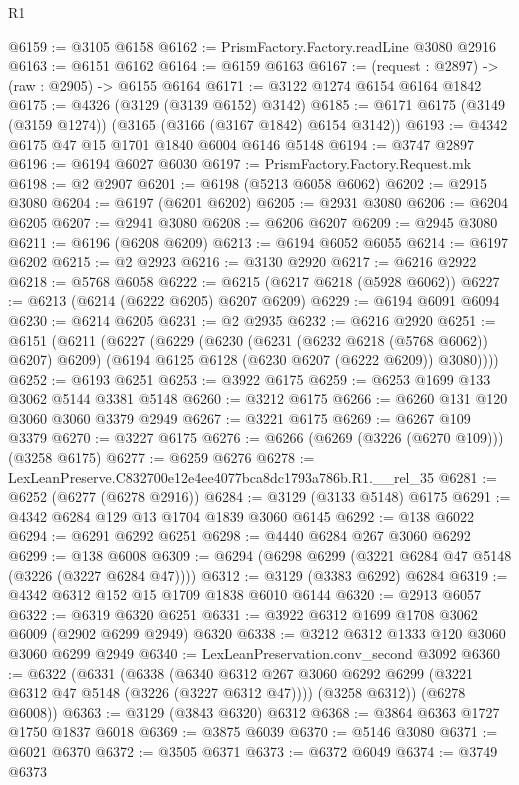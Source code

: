 \begin{lexlean}{R1}
\begin{coremodule}
@6159 := @3105 @6158
@6162 := PrismFactory.Factory.readLine @3080 @2916
@6163 := @6151 @6162
@6164 := @6159 @6163
@6167 := (request : @2897) -> (raw : @2905) -> @6155 @6164
@6171 := @3122 @1274 @6154 @6164 @1842
@6175 := @4326 (@3129 (@3139 @6152) @3142)
@6185 := @6171 @6175 (@3149 (@3159 @1274)) (@3165 (@3166 (@3167 @1842) @6154 @3142))
@6193 := @4342 @6175 @47 @15 @1701 @1840 @6004 @6146 @5148
@6194 := @3747 @2897
@6196 := @6194 @6027 @6030
@6197 := PrismFactory.Factory.Request.mk
@6198 := @2 @2907
@6201 := @6198 (@5213 @6058 @6062)
@6202 := @2915 @3080
@6204 := @6197 (@6201 @6202)
@6205 := @2931 @3080
@6206 := @6204 @6205
@6207 := @2941 @3080
@6208 := @6206 @6207
@6209 := @2945 @3080
@6211 := @6196 (@6208 @6209)
@6213 := @6194 @6052 @6055
@6214 := @6197 @6202
@6215 := @2 @2923
@6216 := @3130 @2920
@6217 := @6216 @2922
@6218 := @5768 @6058
@6222 := @6215 (@6217 @6218 (@5928 @6062))
@6227 := @6213 (@6214 (@6222 @6205) @6207 @6209)
@6229 := @6194 @6091 @6094
@6230 := @6214 @6205
@6231 := @2 @2935
@6232 := @6216 @2920
@6251 := @6151
    (@6211
      (@6227
        (@6229
          (@6230 (@6231 (@6232 @6218 (@5768 @6062)) @6207) @6209)
          (@6194 @6125 @6128 (@6230 @6207 (@6222 @6209)) @3080))))
@6252 := @6193 @6251
@6253 := @3922 @6175
@6259 := @6253 @1699 @133 @3062 @5144 @3381 @5148
@6260 := @3212 @6175
@6266 := @6260 @131 @120 @3060 @3060 @3379 @2949
@6267 := @3221 @6175
@6269 := @6267 @109 @3379
@6270 := @3227 @6175
@6276 := @6266 (@6269 (@3226 (@6270 @109))) (@3258 @6175)
@6277 := @6259 @6276
@6278 := LexLeanPreserve.C832700e12e4ee4077bca8dc1793a786b.R1.__rel_35
@6281 := @6252 (@6277 (@6278 @2916))
@6284 := @3129 (@3133 @5148) @6175
@6291 := @4342 @6284 @129 @13 @1704 @1839 @3060 @6145
@6292 := @138 @6022
@6294 := @6291 @6292 @6251
@6298 := @4440 @6284 @267 @3060 @6292
@6299 := @138 @6008
@6309 := @6294 (@6298 @6299 (@3221 @6284 @47 @5148 (@3226 (@3227 @6284 @47))))
@6312 := @3129 (@3383 @6292) @6284
@6319 := @4342 @6312 @152 @15 @1709 @1838 @6010 @6144
@6320 := @2913 @6057
@6322 := @6319 @6320 @6251
@6331 := @3922 @6312 @1699 @1708 @3062 @6009 (@2902 @6299 @2949) @6320
@6338 := @3212 @6312 @1333 @120 @3060 @3060 @6299 @2949
@6340 := LexLeanPreservation.conv_second @3092
@6360 := @6322
    (@6331
      (@6338
        (@6340 @6312 @267 @3060 @6292 @6299 (@3221 @6312 @47 @5148 (@3226 (@3227 @6312 @47))))
        (@3258 @6312))
      (@6278 @6008))
@6363 := @3129 (@3843 @6320) @6312
@6368 := @3864 @6363 @1727 @1750 @1837 @6018
@6369 := @3875 @6039
@6370 := @5146 @3080
@6371 := @6021 @6370
@6372 := @3505 @6371
@6373 := @6372 @6049
@6374 := @3749 @6373

\end{coremodule}
\end{lexlean}
